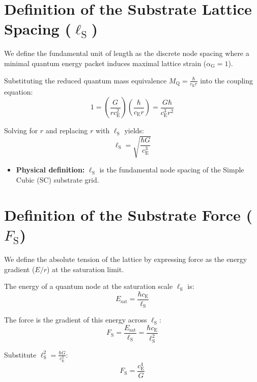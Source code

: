 \section{Definition of the Substrate Lattice Spacing (\texorpdfstring{$\ell_{\mathrm{S}}$}{l\_S})}
We define the fundamental unit of length as the discrete node spacing where a minimal quantum energy packet induces maximal lattice strain ($\alpha_{\mathrm{G}} = 1$).

Substituting the reduced quantum mass equivalence $M_{\mathrm{Q}} = \frac{\hbar}{c_{\mathrm{E}} r}$ into the coupling equation:
\begin{equation}
    1 = \left(\frac{G}{r c_{\mathrm{E}}^2}\right)\left(\frac{\hbar}{c_{\mathrm{E}} r}\right) = \frac{G\hbar}{c_{\mathrm{E}}^3 r^2}
\end{equation}

Solving for $r$ and replacing $r$ with $\ell_{\mathrm{S}}$ yields:
\begin{equation}
    \ell_{\mathrm{S}} = \sqrt{\frac{\hbar G}{c_{\mathrm{E}}^3}}
\end{equation}

\begin{itemize}
    \item \textbf{Physical definition:} $\ell_{\mathrm{S}}$ is the fundamental node spacing of the Simple Cubic (SC) substrate grid.
\end{itemize}

\section{Definition of the Substrate Force (\texorpdfstring{$F_{\mathrm{S}}$}{F\_S})}
We define the absolute tension of the lattice by expressing force as the energy gradient ($E/r$) at the saturation limit.

The energy of a quantum node at the saturation scale $\ell_{\mathrm{S}}$ is:
\begin{equation}
    E_{\mathrm{sat}} = \frac{\hbar c_{\mathrm{E}}}{\ell_{\mathrm{S}}}
\end{equation}

The force is the gradient of this energy across $\ell_{\mathrm{S}}$:
\begin{equation}
    F_{\mathrm{S}} = \frac{E_{\mathrm{sat}}}{\ell_{\mathrm{S}}} = \frac{\hbar c_{\mathrm{E}}}{\ell_{\mathrm{S}}^2}
\end{equation}

Substitute $\ell_{\mathrm{S}}^2 = \frac{\hbar G}{c_{\mathrm{E}}^3}$:
\begin{equation}
    F_{\mathrm{S}} = \frac{c_{\mathrm{E}}^4}{G}
\end{equation}


